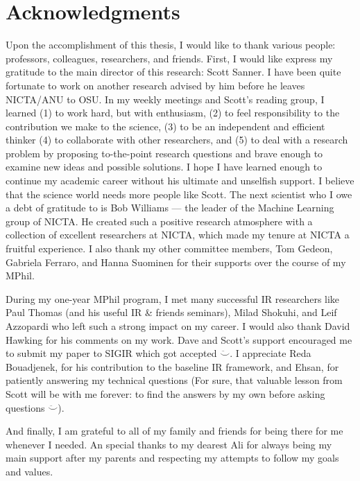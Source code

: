 \chapter*{Acknowledgments}

Upon the accomplishment of this thesis, I would like to thank various people: 
professors, colleagues, researchers, and friends. First, I would like express my gratitude to the main director of this research: Scott Sanner. I have been quite fortunate to work on another research advised by him before he leaves NICTA/ANU to OSU. In my weekly meetings and Scott's reading group,  I learned  (1) to work hard, but with enthusiasm, (2) to feel responsibility to the contribution we make to the science, (3) to be an independent and efficient thinker (4)  to collaborate with other researchers, and (5) to deal with a research problem by proposing to-the-point research questions and brave enough to examine new ideas and possible solutions. I hope I have learned enough to continue my academic career without his ultimate and unselfish support. I believe that the science world needs more people like Scott. The next scientist who I owe a debt of gratitude to is Bob Williams --- the leader of the Machine Learning group of NICTA. He created such a positive research atmosphere with a collection of excellent researchers at NICTA, which made my tenure at NICTA a fruitful experience.
I also thank my other committee members, Tom Gedeon, Gabriela Ferraro, and Hanna Suominen for their supports over the course of my MPhil.

During my one-year MPhil program, I met many successful IR researchers like Paul Thomas (and his useful IR \& friends seminars), Milad Shokuhi, and Leif Azzopardi who left such a strong impact on my career.  I would also thank David Hawking for his comments on my work. Dave and Scott's support encouraged me to submit my paper to SIGIR which got accepted $\ddot\smile$. 
I appreciate Reda Bouadjenek, for his contribution to the baseline IR framework, and Ehsan, for patiently answering my technical questions (For sure, that valuable lesson from Scott will be with me forever: to find the answers by my own before asking questions $\ddot\smile$).

And finally, I am grateful to all of my family and friends for being there for me whenever I needed. An special thanks to my dearest Ali for always being my main support after my parents and respecting my attempts to follow my goals and values. 

